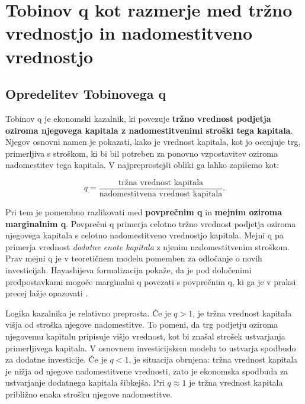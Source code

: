 \documentclass[12pt,a4paper]{article}
\begin{document}
\section{Tobinov q kot razmerje med tržno vrednostjo in nadomestitveno vrednostjo}


\subsection{Opredelitev Tobinovega q}


Tobinov q je ekonomski kazalnik, ki povezuje \textbf{tržno vrednost podjetja oziroma njegovega kapitala z nadomestitvenimi stroški tega kapitala}. Njegov osnovni namen je pokazati, kako je vrednost kapitala, kot jo ocenjuje trg, primerljiva s stroškom, ki bi bil potreben za ponovno vzpostavitev oziroma nadomestitev tega kapitala. V najpreprostejši obliki ga lahko zapišemo kot:

\begin{equation}
q = \frac{\text{tržna vrednost kapitala}}{\text{nadomestitvena vrednost kapitala}}.
\end{equation}

Pri tem je pomembno razlikovati med \textbf{povprečnim q} in \textbf{mejnim oziroma marginalnim q}. Povprečni q primerja celotno tržno vrednost podjetja oziroma njegovega kapitala s celotno nadomestitveno vrednostjo kapitala. Mejni q pa primerja vrednost \emph{dodatne enote kapitala} z njenim nadomestitvenim stroškom. Prav mejni q je v teoretičnem modelu pomemben za odločanje o novih investicijah. Hayashijeva formalizacija pokaže, da je pod določenimi predpostavkami mogoče marginalni q povezati s povprečnim q, ki ga je v praksi precej lažje opazovati \citep{AndreiMannMoyen2017,PetersTaylor2016}.

Logika kazalnika je relativno preprosta. Če je $q>1$, je tržna vrednost kapitala višja od stroška njegove nadomestitve. To pomeni, da trg podjetju oziroma njegovemu kapitalu pripisuje višjo vrednost, kot bi znašal strošek ustvarjanja primerljivega kapitala. V osnovnem investicijskem modelu to ustvarja spodbudo za dodatne investicije. Če je $q<1$, je situacija obrnjena: tržna vrednost kapitala je nižja od njegove nadomestitvene vrednosti, zato je ekonomska spodbuda za ustvarjanje dodatnega kapitala šibkejša. Pri $q \approx 1$ je tržna vrednost kapitala približno enaka strošku njegove nadomestitve.
\end{document}
